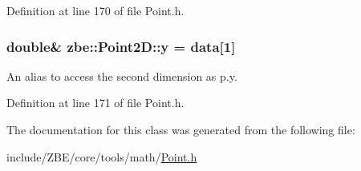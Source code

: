 Definition at line 170 of file Point.\+h.

\hypertarget{classzbe_1_1_point2_d_a9f1e20366f38743e2d3264bd4cb633f2}{}
\subsubsection[{y}]{\setlength{\rightskip}{0pt plus 5cm}double\& zbe\+::\+Point2\+D\+::y = {\bf data}\mbox{[}1\mbox{]}}\label{classzbe_1_1_point2_d_a9f1e20366f38743e2d3264bd4cb633f2}


An alias to access the second dimension as p.\+y. 



Definition at line 171 of file Point.\+h.



The documentation for this class was generated from the following file\+:\begin{DoxyCompactItemize}
\item 
include/\+Z\+B\+E/core/tools/math/\hyperlink{_point_8h}{Point.\+h}\end{DoxyCompactItemize}
